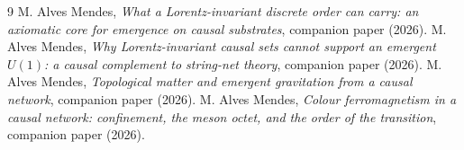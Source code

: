 \documentclass[aps,prd,reprint,nofootinbib,superscriptaddress,floatfix]{revtex4-2}
\begin{document}
\begin{thebibliography}{9}
 M. Alves Mendes, \emph{What a Lorentz-invariant discrete order can carry: an
axiomatic core for emergence on causal substrates}, companion paper (2026).
 M. Alves Mendes, \emph{Why Lorentz-invariant causal sets cannot support an
emergent $U(1)$: a causal complement to string-net theory}, companion paper (2026).
 M. Alves Mendes, \emph{Topological matter and emergent gravitation from a
causal network}, companion paper (2026).
 M. Alves Mendes, \emph{Colour ferromagnetism in a causal network: confinement, the
meson octet, and the order of the transition}, companion paper (2026).
\end{thebibliography}
\end{document}
